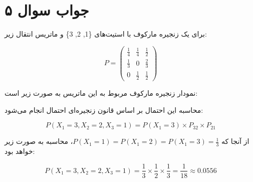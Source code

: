 \section*{جواب سوال ۵}

برای یک زنجیره مارکوف با استیت‌های \{1, 2, 3\} و ماتریس انتقال زیر:

\[
P = \begin{pmatrix}
	\frac{1}{4} & \frac{1}{4} & \frac{1}{2} \\
	\frac{1}{3} & 0 & \frac{2}{3} \\
	0 & \frac{1}{2} & \frac{1}{2}
\end{pmatrix}
\]

نمودار زنجیره مارکوف مربوط به این ماتریس به صورت زیر است:

محاسبه این احتمال بر اساس قانون زنجیره‌ای احتمال انجام می‌شود:

\[
P(X_1 = 3, X_2 = 2, X_3 = 1) = P(X_1 = 3) \times P_{32} \times P_{21}
\]

از آنجا که \(P(X_1 = 1) = P(X_1 = 2) = P(X_1 = 3) = \frac{1}{3}\)، محاسبه به صورت زیر خواهد بود:

\[
P(X_1 = 3, X_2 = 2, X_3 = 1) = \frac{1}{3} \times \frac{1}{2} \times \frac{1}{3} = \frac{1}{18} \approx 0.0556
\]